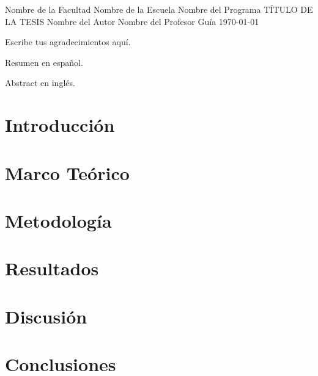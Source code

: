 \documentclass[12pt]{report}
\begin{document}
\PUCVTitlePage
  {Nombre de la Facultad}
  {Nombre de la Escuela}
  {Nombre del Programa}
  {TÍTULO DE LA TESIS}
  {Nombre del Autor}
  {Nombre del Profesor Guía}
  {\today}

Escribe tus agradecimientos aquí.

Resumen en español.

Abstract en inglés.

\tableofcontents
\newpage

\chapter{Introducción}
\lipsum[1-2]

\chapter{Marco Teórico}
\lipsum[3-4]

\chapter{Metodología}
\lipsum[5-6]

\chapter{Resultados}
\lipsum[7-8]

\chapter{Discusión}
\lipsum[9]

\chapter{Conclusiones}
\lipsum[10]

\end{document}
